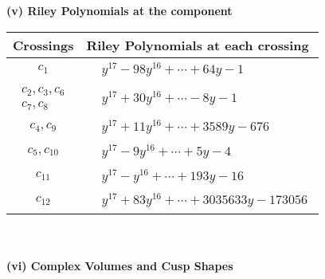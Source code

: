\documentclass[1p]{elsarticle_modified}
\theoremstyle{definition}
\begin{document}
\newpage\renewcommand{\arraystretch}{1}
\flushleft \textbf{(v) Riley Polynomials at the component}\newline \\
\begin{tabular}{m{50pt}|m{274pt}}
Crossings & \hspace{64pt}Riley Polynomials at each crossing \\
\hline $$\begin{aligned}c_{1}\end{aligned}$$&$\begin{aligned}
&y^{17}-98 y^{16}+\cdots+64 y-1
\end{aligned}$\\
\hline $$\begin{aligned}c_{2},c_{3},c_{6}\\c_{7},c_{8}\end{aligned}$$&$\begin{aligned}
&y^{17}+30 y^{16}+\cdots-8 y-1
\end{aligned}$\\
\hline $$\begin{aligned}c_{4},c_{9}\end{aligned}$$&$\begin{aligned}
&y^{17}+11 y^{16}+\cdots+3589 y-676
\end{aligned}$\\
\hline $$\begin{aligned}c_{5},c_{10}\end{aligned}$$&$\begin{aligned}
&y^{17}-9 y^{16}+\cdots+5 y-4
\end{aligned}$\\
\hline $$\begin{aligned}c_{11}\end{aligned}$$&$\begin{aligned}
&y^{17}- y^{16}+\cdots+193 y-16
\end{aligned}$\\
\hline $$\begin{aligned}c_{12}\end{aligned}$$&$\begin{aligned}
&y^{17}+83 y^{16}+\cdots+3035633 y-173056
\end{aligned}$\\
\hline
\end{tabular}\\~\\
\newpage\flushleft \textbf{(vi) Complex Volumes and Cusp Shapes}
\end{document}
